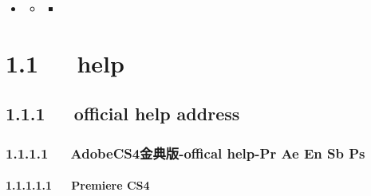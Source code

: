 \documentclass[letterpaper,12pt,english]{sphinxmanual}
\begin{document}
\begin{sphinxShadowBox}
\begin{itemize}
\begin{itemize}
\begin{itemize}
\item {} 
\label{\detokenize{001software/001install/adobe:id26}}{\hyperref[\detokenize{001software/001install/adobe:id4}]{}}

\end{itemize}

\item {} 
\label{\detokenize{001software/001install/adobe:id27}}{\hyperref[\detokenize{001software/001install/adobe:premiere-pro-cs4}]{}}
\begin{itemize}
\item {} 
\label{\detokenize{001software/001install/adobe:id28}}{\hyperref[\detokenize{001software/001install/adobe:tips}]{}}
\begin{itemize}
\item {} 
\label{\detokenize{001software/001install/adobe:id29}}{\hyperref[\detokenize{001software/001install/adobe:id5}]{}}

\end{itemize}

\end{itemize}

\end{itemize}

\end{itemize}
\end{sphinxShadowBox}


\section{1.1   help}
\label{\detokenize{001software/001install/adobe:help}}

\subsection{1.1.1   official help address}
\label{\detokenize{001software/001install/adobe:official-help-address}}

\subsubsection{1.1.1.1   AdobeCS4金典版-offical help-Pr Ae En Sb Ps}
\label{\detokenize{001software/001install/adobe:adobecs4-offical-help-pr-ae-en-sb-ps}}

\paragraph{1.1.1.1.1   Premiere CS4}
\label{\detokenize{001software/001install/adobe:premiere-cs4}}
\end{document}

